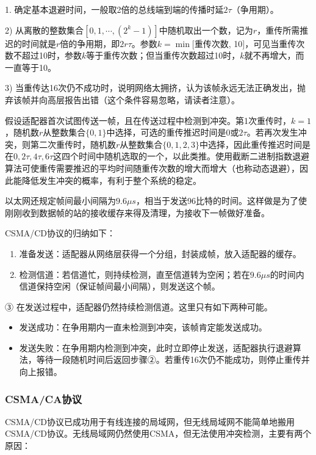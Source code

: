 \documentclass{ctexbook}
\begin{document}
	1. 确定基本退避时间，一般取2倍的总线端到端的传播时延$2\tau$（争用期）。
	
	2) 从离散的整数集合$[0, 1, \cdots, (2^{k}-1)]$中随机取出一个数，记为$r$，重传所需推迟的时间就是$r$倍的争用期，即$2r\tau$。参数$k = \min[$重传次数, 10$]$，可见当重传次数不超过10时，参数$k$等于重传次数；但当重传次数超过10时，$k$就不再增大，而一直等于10。
	
	3) 当重传达16次仍不成功时，说明网络太拥挤，认为该帧永远无法正确发出，抛弃该帧并向高层报告出错（这个条件容易忽略，请读者注意）。
	
	假设适配器首次试图传送一帧，且在传送过程中检测到冲突。第1次重传时，$k = 1$，随机数$r$从整数集合$\{0, 1\}$中选择，可选的重传推迟时间是$0$或$2\tau$。若再次发生冲突，则第二次重传时，随机数$r$从整数集合$\{0, 1, 2, 3\}$中选择，因此重传推迟时间是在$0, 2\tau, 4\tau, 6\tau$这四个时间中随机选取的一个，以此类推。使用截断二进制指数退避算法可使重传需要推迟的平均时间随重传次数的增大而增大（也称动态退避），因此能降低发生冲突的概率，有利于整个系统的稳定。
	
	以太网还规定帧间最小间隔为$9.6\mu s$，相当于发送96比特的时间。这样做是为了使刚刚收到数据帧的站的接收缓存来得及清理，为接收下一帧做好准备。
	
	CSMA/CD协议的归纳如下：
	\begin{enumerate}
		\item 准备发送：适配器从网络层获得一个分组，封装成帧，放入适配器的缓存。
		\item 检测信道：若信道忙，则持续检测，直至信道转为空闲；若在$9.6\mu s$的时间内信道保持空闲（保证帧间最小间隔），则发送这个帧。
	\end{enumerate}
	
	③ 在发送过程中，适配器仍然持续检测信道。这里只有如下两种可能。
	\begin{itemize}
		\item 发送成功：在争用期内一直未检测到冲突，该帧肯定能发送成功。
		\item 发送失败：在争用期内检测到冲突，此时立即停止发送，适配器执行退避算法，等待一段随机时间后返回步骤②。若重传16次仍不能成功，则停止重传并向上报错。
	\end{itemize}
	
	\subsubsection{CSMA/CA协议}
	CSMA/CD协议已成功用于有线连接的局域网，但无线局域网不能简单地搬用CSMA/CD协议。无线局域网仍然使用CSMA，但无法使用冲突检测，主要有两个原因：
	
\end{document}

